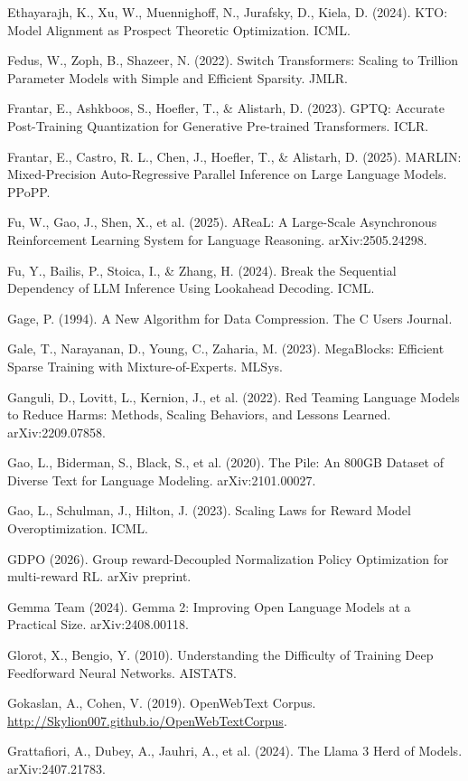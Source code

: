 {\begin{enumerate}[leftmargin=*,itemsep=1pt,label={[\arabic*]}]
\item Ethayarajh, K., Xu, W., Muennighoff, N., Jurafsky, D., Kiela, D. (2024). KTO: Model Alignment as Prospect Theoretic Optimization. ICML.
\item Fedus, W., Zoph, B., Shazeer, N. (2022). Switch Transformers: Scaling to Trillion Parameter Models with Simple and Efficient Sparsity. JMLR.
\item Frantar, E., Ashkboos, S., Hoefler, T., \& Alistarh, D. (2023). GPTQ: Accurate Post-Training Quantization for Generative Pre-trained Transformers. ICLR.
\item Frantar, E., Castro, R. L., Chen, J., Hoefler, T., \& Alistarh, D. (2025). MARLIN: Mixed-Precision Auto-Regressive Parallel Inference on Large Language Models. PPoPP.
\item Fu, W., Gao, J., Shen, X., et al. (2025). AReaL: A Large-Scale Asynchronous Reinforcement Learning System for Language Reasoning. arXiv:2505.24298.
\item Fu, Y., Bailis, P., Stoica, I., \& Zhang, H. (2024). Break the Sequential Dependency of LLM Inference Using Lookahead Decoding. ICML.
\item Gage, P. (1994). A New Algorithm for Data Compression. The C Users Journal.
\item Gale, T., Narayanan, D., Young, C., Zaharia, M. (2023). MegaBlocks: Efficient Sparse Training with Mixture-of-Experts. MLSys.
\item Ganguli, D., Lovitt, L., Kernion, J., et al. (2022). Red Teaming Language Models to Reduce Harms: Methods, Scaling Behaviors, and Lessons Learned. arXiv:2209.07858.
\item Gao, L., Biderman, S., Black, S., et al. (2020). The Pile: An 800GB Dataset of Diverse Text for Language Modeling. arXiv:2101.00027.
\item Gao, L., Schulman, J., Hilton, J. (2023). Scaling Laws for Reward Model Overoptimization. ICML.
\item GDPO (2026). Group reward-Decoupled Normalization Policy Optimization for multi-reward RL. arXiv preprint.
\item Gemma Team (2024). Gemma 2: Improving Open Language Models at a Practical Size. arXiv:2408.00118.
\item Glorot, X., Bengio, Y. (2010). Understanding the Difficulty of Training Deep Feedforward Neural Networks. AISTATS.
\item Gokaslan, A., Cohen, V. (2019). OpenWebText Corpus. \url{http://Skylion007.github.io/OpenWebTextCorpus}.
\item Grattafiori, A., Dubey, A., Jauhri, A., et al. (2024). The Llama 3 Herd of Models. arXiv:2407.21783.

\end{enumerate}}
